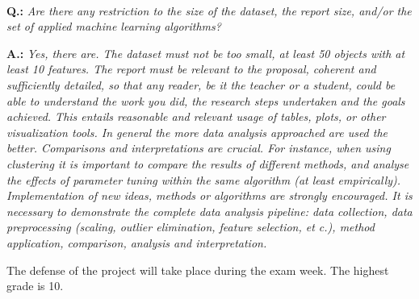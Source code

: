 \documentclass[12pt]{article}         %
\begin{document}
\

\textbf{Q.:} \textit{Are there any restriction to the size of the dataset, the report size, and/or the set of applied machine learning algorithms?}

\textbf{A.:} \textit{Yes, there are. The dataset must not be too small, at least 50
objects with at least 10 features. The report must be relevant to the proposal, coherent
and sufficiently detailed, so that any reader, be it the teacher or a student, could be
able to understand the work you did, the research steps undertaken and the goals achieved.
This entails reasonable and relevant usage of tables, plots, or other visualization tools.
In general the more data analysis approached are used the better. Comparisons and
interpretations are crucial. For instance, when using clustering it is important to
compare the results of different methods, and analyse the effects of parameter tuning
within the same algorithm (at least empirically). Implementation of new ideas, methods
or algorithms are strongly encouraged.
It is necessary to demonstrate the complete data analysis pipeline: data collection,
data preprocessing (scaling, outlier elimination, feature selection, et c.), method
application, comparison, analysis and interpretation.}

The defense of the project will take place during the exam week. The highest grade is 10.
\end{document}
